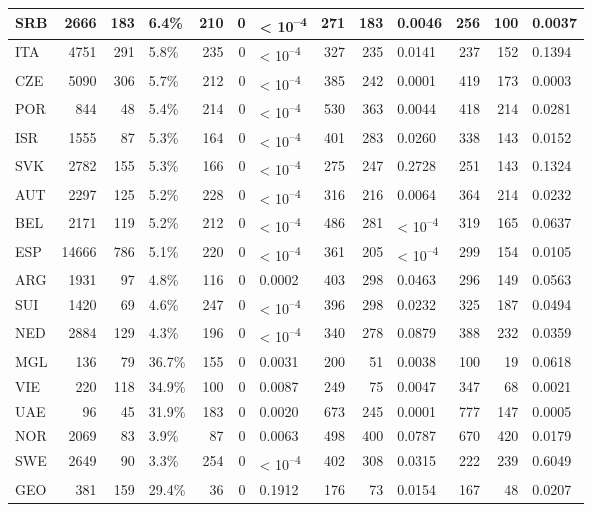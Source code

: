 \begin{tabular}{l|r|r|l|r|r|l|r|r|l|r|r|l}
\hline
SRB & 2666 & 183 & 6.4\% & 210 & 0 & < 10\textsuperscript{--4} & 271 & 183 & 0.0046 & 256 & 100 & 0.0037\\
\hline
ITA & 4751 & 291 & 5.8\% & 235 & 0 & < 10\textsuperscript{--4} & 327 & 235 & 0.0141 & 237 & 152 & 0.1394\\
\hline
CZE & 5090 & 306 & 5.7\% & 212 & 0 & < 10\textsuperscript{--4} & 385 & 242 & 0.0001 & 419 & 173 & 0.0003\\
\hline
POR & 844 & 48 & 5.4\% & 214 & 0 & < 10\textsuperscript{--4} & 530 & 363 & 0.0044 & 418 & 214 & 0.0281\\
\hline
ISR & 1555 & 87 & 5.3\% & 164 & 0 & < 10\textsuperscript{--4} & 401 & 283 & 0.0260 & 338 & 143 & 0.0152\\
\hline
SVK & 2782 & 155 & 5.3\% & 166 & 0 & < 10\textsuperscript{--4} & 275 & 247 & 0.2728 & 251 & 143 & 0.1324\\
\hline
AUT & 2297 & 125 & 5.2\% & 228 & 0 & < 10\textsuperscript{--4} & 316 & 216 & 0.0064 & 364 & 214 & 0.0232\\
\hline
BEL & 2171 & 119 & 5.2\% & 212 & 0 & < 10\textsuperscript{--4} & 486 & 281 & < 10\textsuperscript{--4} & 319 & 165 & 0.0637\\
\hline
ESP & 14666 & 786 & 5.1\% & 220 & 0 & < 10\textsuperscript{--4} & 361 & 205 & < 10\textsuperscript{--4} & 299 & 154 & 0.0105\\
\hline
ARG & 1931 & 97 & 4.8\% & 116 & 0 & 0.0002 & 403 & 298 & 0.0463 & 296 & 149 & 0.0563\\
\hline
SUI & 1420 & 69 & 4.6\% & 247 & 0 & < 10\textsuperscript{--4} & 396 & 298 & 0.0232 & 325 & 187 & 0.0494\\
\hline
NED & 2884 & 129 & 4.3\% & 196 & 0 & < 10\textsuperscript{--4} & 340 & 278 & 0.0879 & 388 & 232 & 0.0359\\
\hline
MGL & 136 & 79 & 36.7\% & 155 & 0 & 0.0031 & 200 & 51 & 0.0038 & 100 & 19 & 0.0618\\
\hline
VIE & 220 & 118 & 34.9\% & 100 & 0 & 0.0087 & 249 & 75 & 0.0047 & 347 & 68 & 0.0021\\
\hline
UAE & 96 & 45 & 31.9\% & 183 & 0 & 0.0020 & 673 & 245 & 0.0001 & 777 & 147 & 0.0005\\
\hline
NOR & 2069 & 83 & 3.9\% & 87 & 0 & 0.0063 & 498 & 400 & 0.0787 & 670 & 420 & 0.0179\\
\hline
SWE & 2649 & 90 & 3.3\% & 254 & 0 & < 10\textsuperscript{--4} & 402 & 308 & 0.0315 & 222 & 239 & 0.6049\\
\hline
GEO & 381 & 159 & 29.4\% & 36 & 0 & 0.1912 & 176 & 73 & 0.0154 & 167 & 48 & 0.0207\\

\end{tabular}
